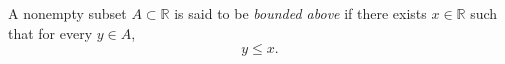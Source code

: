 A nonempty subset $A \subset \mathbb{R}$ is said to be \textit{bounded above} if there exists $x \in \mathbb{R}$ such that for every $y \in A$,
\begin{equation*}
y \leq x.
\end{equation*}

